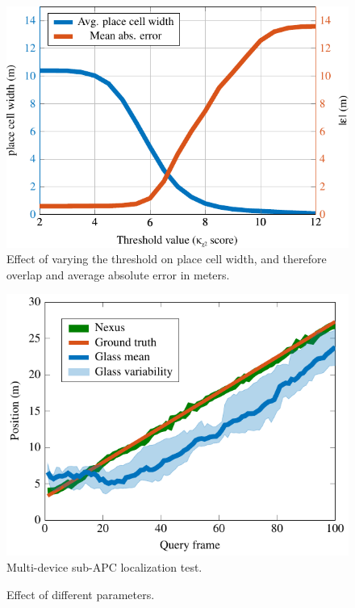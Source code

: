 \begin{figure}[h!]
\centering
\includegraphics[width=\textwidth]{gfx/Chapter05/errorWidthEvalDSIFT_16pc.pdf}
\caption{Effect of varying the threshold on place cell width, and therefore overlap and average absolute error in meters.}
\label{fig:threshEval}
\end{figure}


\begin{figure}
\centering
\includegraphics[width=\textwidth]{gfx/Chapter05/nexusVsGlass_sf_gabor_C2.pdf}
\caption{Multi-device sub-APC localization test.}
\label{fig:multiDevice}
\end{figure}



\begin{figure}[t]
\centering
{}\label{fig:threshEval}
\label{fig:multiDevice}
\caption{Effect of different parameters.}
\label{fig:}
\end{figure}



